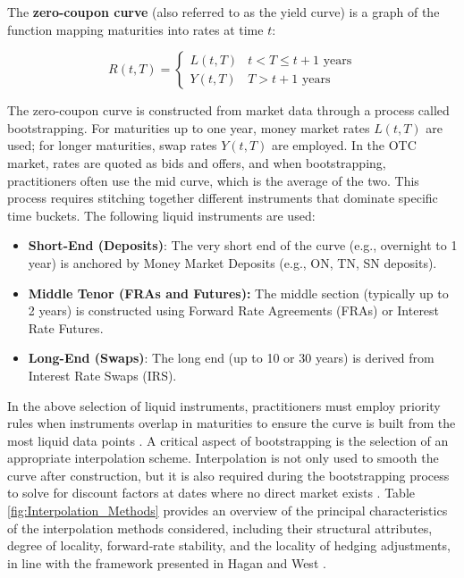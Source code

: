     \begin{definition} \label{def:zcb-curve}
    The \textbf{zero-coupon curve} (also referred to as the yield curve) is a graph of the function mapping maturities into rates at time $t$:
    
    \begin{equation}
    R(t,T) =
        \begin{cases}
            L(t,T) & \text{$t < T \leq t+1$ years}\\
            Y(t,T) & \text{$T > t+1$ years}
        \end{cases}
    \end{equation}
    
    \end{definition}
    \noindent
    The zero-coupon curve is constructed from market data through a process called bootstrapping. For maturities up to one year, money market rates $L(t,T)$ are used; for longer maturities, swap rates $Y(t,T)$ are employed. In the OTC market, rates are quoted as bids and offers, and when bootstrapping, practitioners often use the mid curve, which is the average of the two. This process requires stitching together different instruments that dominate specific time buckets. The following liquid instruments are used: \\
      
     \begin{itemize}
         \item \textbf{Short-End (Deposits)}: The very short end of the curve (e.g., overnight to 1 year) is anchored by Money Market Deposits (e.g., ON, TN, SN deposits).
         \item \textbf{Middle Tenor (FRAs and Futures):} The middle section (typically up to 2 years) is constructed using Forward Rate Agreements (FRAs) or Interest Rate Futures. 
         \item \textbf{ Long-End (Swaps)}: The long end (up to 10 or 30 years) is derived from Interest Rate Swaps (IRS).
     \end{itemize}

    \noindent
    In the above selection of liquid instruments, practitioners must employ priority rules when instruments overlap in maturities to ensure the curve is built from the most liquid data points \cite{bianchetti2008two}. A critical aspect of bootstrapping is the selection of an appropriate interpolation scheme. Interpolation is not only used to smooth the curve after construction, but it is also required during the bootstrapping process to solve for discount factors at dates where no direct market exists \cite{ametrano2013everything}. Table \ref{fig:Interpolation_Methods} provides an overview of the principal characteristics of the interpolation methods considered, including their structural attributes, degree of locality, forward‑rate stability, and the locality of hedging adjustments, in line with the framework presented in Hagan and West \cite{hagan2008methods}.  \\


